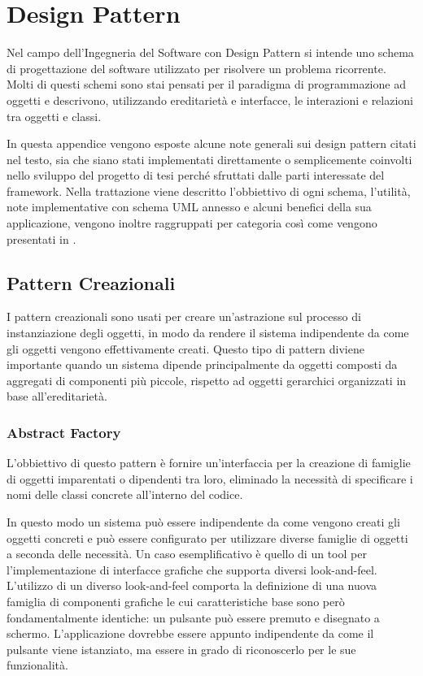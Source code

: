
\chapter{Design Pattern}
\label{a:designpatterns}
Nel campo dell'Ingegneria del Software con Design Pattern si intende uno schema di progettazione del software utilizzato per risolvere un problema ricorrente.
Molti di questi schemi sono stai pensati per il paradigma di programmazione ad oggetti e descrivono, utilizzando ereditarietà e interfacce, le interazioni e relazioni tra oggetti e classi.

In questa appendice vengono esposte alcune note generali sui design pattern citati nel testo, sia che siano stati implementati direttamente o semplicemente coinvolti nello sviluppo del progetto di tesi perché sfruttati dalle parti interessate del framework.
Nella trattazione viene descritto l'obbiettivo di ogni schema, l'utilità, note implementative con schema \ac{UML} annesso e alcuni benefici della sua applicazione, vengono inoltre raggruppati per categoria così come vengono presentati in \cite{book:designpattern}.

\section{Pattern Creazionali}
I pattern creazionali sono usati per creare un'astrazione sul processo di instanziazione degli oggetti, in modo da rendere il sistema indipendente da come gli oggetti vengono effettivamente creati. Questo tipo di pattern diviene importante quando un sistema dipende principalmente da oggetti composti da aggregati di componenti più piccole, rispetto ad oggetti gerarchici organizzati in base all'ereditarietà.

\subsection{Abstract Factory}
\label{sub:abstractfactory}
L'obbiettivo di questo pattern è fornire un'interfaccia per la creazione di famiglie di oggetti imparentati o dipendenti tra loro, eliminado la necessità di specificare i nomi delle classi concrete all'interno del codice.

In questo modo un sistema può essere indipendente da come vengono creati gli oggetti concreti e può essere configurato per utilizzare diverse famiglie di oggetti a seconda delle necessità. Un caso esemplificativo è quello di un tool per l'implementazione di interfacce grafiche che supporta diversi look-and-feel. L'utilizzo di un diverso look-and-feel comporta la definizione di una nuova famiglia di componenti grafiche le cui caratteristiche base sono però fondamentalmente identiche: un pulsante può essere premuto e disegnato a schermo. L'applicazione dovrebbe essere appunto indipendente da come il pulsante viene istanziato, ma essere in grado di riconoscerlo per le sue funzionalità.

